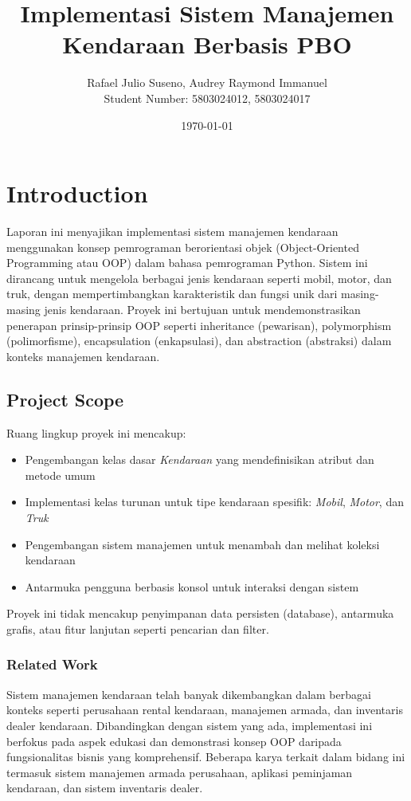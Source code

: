 \documentclass[12pt]{article}
\title{\textbf{Implementasi Sistem Manajemen Kendaraan Berbasis PBO}\\
\large }
\author{Rafael Julio Suseno, Audrey Raymond Immanuel\\Student Number: 5803024012, 5803024017}
\date{\today}
\begin{document}
\maketitle
\tableofcontents
\newpage

\section{Introduction}
Laporan ini menyajikan implementasi sistem manajemen kendaraan menggunakan konsep pemrograman berorientasi objek (Object-Oriented Programming atau OOP) dalam bahasa pemrograman Python. Sistem ini dirancang untuk mengelola berbagai jenis kendaraan seperti mobil, motor, dan truk, dengan mempertimbangkan karakteristik dan fungsi unik dari masing-masing jenis kendaraan. Proyek ini bertujuan untuk mendemonstrasikan penerapan prinsip-prinsip OOP seperti inheritance (pewarisan), polymorphism (polimorfisme), encapsulation (enkapsulasi), dan abstraction (abstraksi) dalam konteks manajemen kendaraan.

\subsection{Project Scope}
Ruang lingkup proyek ini mencakup:
\begin{itemize}
    \item Pengembangan kelas dasar \textit{Kendaraan} yang mendefinisikan atribut dan metode umum
    \item Implementasi kelas turunan untuk tipe kendaraan spesifik: \textit{Mobil}, \textit{Motor}, dan \textit{Truk}
    \item Pengembangan sistem manajemen untuk menambah dan melihat koleksi kendaraan
    \item Antarmuka pengguna berbasis konsol untuk interaksi dengan sistem
\end{itemize}

Proyek ini tidak mencakup penyimpanan data persisten (database), antarmuka grafis, atau fitur lanjutan seperti pencarian dan filter.

\subsubsection{Related Work}
Sistem manajemen kendaraan telah banyak dikembangkan dalam berbagai konteks seperti perusahaan rental kendaraan, manajemen armada, dan inventaris dealer kendaraan. Dibandingkan dengan sistem yang ada, implementasi ini berfokus pada aspek edukasi dan demonstrasi konsep OOP daripada fungsionalitas bisnis yang komprehensif. Beberapa karya terkait dalam bidang ini termasuk sistem manajemen armada perusahaan, aplikasi peminjaman kendaraan, dan sistem inventaris dealer.
\end{document}
